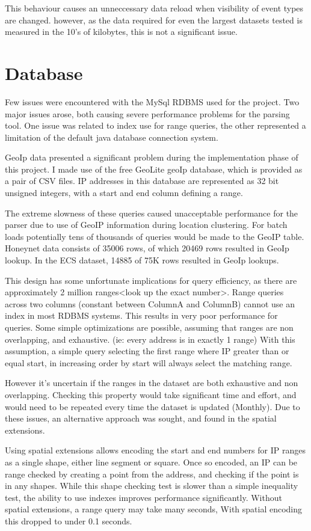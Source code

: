 This behaviour causes an unneccessary data reload when visibility of event types are changed. however, as the data required for even the largest datasets tested is measured in the 10's of kilobytes, this is not a significant issue. 

\section{Database}\label{imp_db}
Few issues were encountered with the MySql RDBMS used for the project. Two major issues arose, both causing severe performance problems for the parsing tool. One issue was related to index use for range queries, the other represented a limitation of the default java database connection system. 

GeoIp data presented a significant problem during the implementation phase of this project. I made use of the free GeoLite geoIp database, which is provided as a pair of CSV files. IP addresses in this database are represented as 32 bit unsigned integers, with a start and end column defining a range.

The extreme slowness of these queries caused unacceptable performance for the parser due to use of GeoIP information during location clustering. For batch loads potentially tens of thousands of queries would be made to the GeoIP table. Honeynet data consists of 35006 rows, of which 20469 rows resulted in GeoIp lookup. In the ECS dataset, 14885 of 75K rows resulted in GeoIp lookups. 

This design has some unfortunate implications for query efficiency, as there are approximately 2 million ranges<look up the exact number>. Range queries across two columns (constant between ColumnA and ColumnB) cannot use an index in most RDBMS systems. This results in very poor performance for queries.
Some simple optimizations are possible, assuming that ranges are non overlapping, and exhaustive. (ie: every address is in exactly 1 range)  With this assumption, a simple query selecting the first range where IP greater than or equal start, in increasing order by start will always select the matching range.

However it's uncertain if the ranges in the dataset are both exhaustive and non overlapping. Checking this property would take significant time and effort, and would need to be repeated  every time the dataset is updated (Monthly). Due to these issues, an alternative approach was sought, and found in the spatial extensions.

Using spatial extensions allows encoding the start and end numbers for IP ranges as a single shape, either line segment or square. Once so encoded, an IP can be range checked by creating a point from the address, and checking if the point is in any shapes. While this shape checking test is slower than a simple inequality test, the ability to use indexes improves performance significantly. Without spatial extensions, a range query may take many seconds, With spatial encoding this dropped to under 0.1 seconds.  

